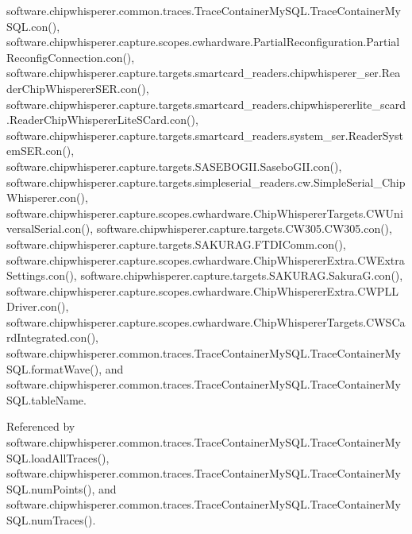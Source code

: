 software.\+chipwhisperer.\+common.\+traces.\+Trace\+Container\+My\+S\+Q\+L.\+Trace\+Container\+My\+S\+Q\+L.\+con(), software.\+chipwhisperer.\+capture.\+scopes.\+cwhardware.\+Partial\+Reconfiguration.\+Partial\+Reconfig\+Connection.\+con(), software.\+chipwhisperer.\+capture.\+targets.\+smartcard\+\_\+readers.\+chipwhisperer\+\_\+ser.\+Reader\+Chip\+Whisperer\+S\+E\+R.\+con(), software.\+chipwhisperer.\+capture.\+targets.\+smartcard\+\_\+readers.\+chipwhispererlite\+\_\+scard.\+Reader\+Chip\+Whisperer\+Lite\+S\+Card.\+con(), software.\+chipwhisperer.\+capture.\+targets.\+smartcard\+\_\+readers.\+system\+\_\+ser.\+Reader\+System\+S\+E\+R.\+con(), software.\+chipwhisperer.\+capture.\+targets.\+S\+A\+S\+E\+B\+O\+G\+I\+I.\+Sasebo\+G\+I\+I.\+con(), software.\+chipwhisperer.\+capture.\+targets.\+simpleserial\+\_\+readers.\+cw.\+Simple\+Serial\+\_\+\+Chip\+Whisperer.\+con(), software.\+chipwhisperer.\+capture.\+scopes.\+cwhardware.\+Chip\+Whisperer\+Targets.\+C\+W\+Universal\+Serial.\+con(), software.\+chipwhisperer.\+capture.\+targets.\+C\+W305.\+C\+W305.\+con(), software.\+chipwhisperer.\+capture.\+targets.\+S\+A\+K\+U\+R\+A\+G.\+F\+T\+D\+I\+Comm.\+con(), software.\+chipwhisperer.\+capture.\+scopes.\+cwhardware.\+Chip\+Whisperer\+Extra.\+C\+W\+Extra\+Settings.\+con(), software.\+chipwhisperer.\+capture.\+targets.\+S\+A\+K\+U\+R\+A\+G.\+Sakura\+G.\+con(), software.\+chipwhisperer.\+capture.\+scopes.\+cwhardware.\+Chip\+Whisperer\+Extra.\+C\+W\+P\+L\+L\+Driver.\+con(), software.\+chipwhisperer.\+capture.\+scopes.\+cwhardware.\+Chip\+Whisperer\+Targets.\+C\+W\+S\+Card\+Integrated.\+con(), software.\+chipwhisperer.\+common.\+traces.\+Trace\+Container\+My\+S\+Q\+L.\+Trace\+Container\+My\+S\+Q\+L.\+format\+Wave(), and software.\+chipwhisperer.\+common.\+traces.\+Trace\+Container\+My\+S\+Q\+L.\+Trace\+Container\+My\+S\+Q\+L.\+table\+Name.



Referenced by software.\+chipwhisperer.\+common.\+traces.\+Trace\+Container\+My\+S\+Q\+L.\+Trace\+Container\+My\+S\+Q\+L.\+load\+All\+Traces(), software.\+chipwhisperer.\+common.\+traces.\+Trace\+Container\+My\+S\+Q\+L.\+Trace\+Container\+My\+S\+Q\+L.\+num\+Points(), and software.\+chipwhisperer.\+common.\+traces.\+Trace\+Container\+My\+S\+Q\+L.\+Trace\+Container\+My\+S\+Q\+L.\+num\+Traces().



